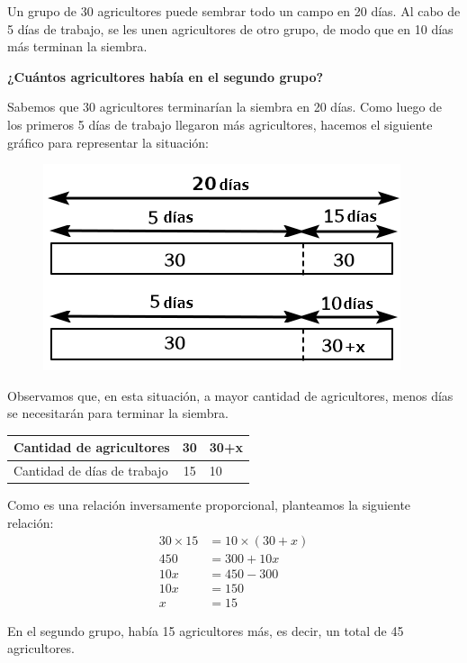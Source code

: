 Un grupo de 30 agricultores puede sembrar todo un campo en 20 días. Al cabo de 5 días de trabajo,
se les unen agricultores de otro grupo, de modo que en 10 días
más terminan la siembra.

\textbf{¿Cuántos agricultores había en el segundo grupo?}

\begin{solutionbox}{9cm}
    Sabemos que 30 agricultores terminarían la siembra en 20 días. Como luego de los primeros 5 días de trabajo llegaron más agricultores, hacemos el siguiente gráfico para representar la situación:

    \begin{minipage}{.35\textwidth}
        \begin{figure}[H]
            \centering
            \includegraphics[width=\linewidth]{../images/tableS8L103_agri}
        \end{figure}
    \end{minipage}\hfill
    \begin{minipage}{.55\textwidth}
        Observamos que, en esta situación, a mayor cantidad de agricultores, menos días se necesitarán para terminar la siembra.
        \begin{table}[H]
            \centering
            \begin{tabular}{|l|c|l|}
                \hline
                Cantidad de agricultores    & 30 & 30+x \\
                \hline
                Cantidad de días de trabajo & 15 & 10   \\
                \hline
            \end{tabular}
        \end{table}
        Como es una relación inversamente proporcional, planteamos la siguiente relación:
        \begin{align*}
            30 \times 15 & = 10 \times (30+x) \\
            450          & = 300 +10x         \\
            10x          & = 450-300          \\
            10x          & = 150              \\
            x            & = 15
        \end{align*}
    \end{minipage}

    En el segundo grupo, había 15 agricultores más, es decir, un total de 45 agricultores.
\end{solutionbox}